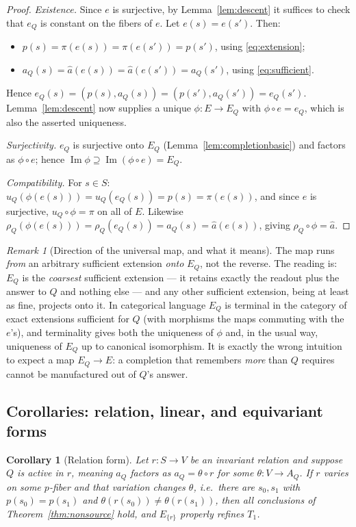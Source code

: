 \documentclass[11pt,reqno]{amsart}
\theoremstyle{plain}
\newtheorem{corollary}[theorem]{Corollary}
\theoremstyle{definition}
\theoremstyle{remark}
\newtheorem{remark}[theorem]{Remark}
\DeclareMathOperator{\Ima}{Im}
\begin{document}
\begin{proof}
\emph{Existence.} Since $e$ is surjective, by Lemma~\ref{lem:descent} it suffices to check that $e_Q$ is constant on the fibers of $e$. Let $e(s)=e(s')$. Then:
\begin{itemize}
\item $p(s)=\pi(e(s))=\pi(e(s'))=p(s')$, using \eqref{eq:extension};
\item $a_Q(s)=\hat a(e(s))=\hat a(e(s'))=a_Q(s')$, using \eqref{eq:sufficient}.
\end{itemize}
Hence $e_Q(s)=(p(s),a_Q(s))=(p(s'),a_Q(s'))=e_Q(s')$. Lemma~\ref{lem:descent} now supplies a unique $\phi\colon E\to E_Q$ with $\phi\circ e=e_Q$, which is also the asserted uniqueness.

\emph{Surjectivity.} $e_Q$ is surjective onto $E_Q$ (Lemma~\ref{lem:completionbasic}) and factors as $\phi\circ e$; hence $\Ima\phi\supseteq\Ima(\phi\circ e)=E_Q$.

\emph{Compatibility.} For $s\in S$: $u_Q(\phi(e(s)))=u_Q(e_Q(s))=p(s)=\pi(e(s))$, and since $e$ is surjective, $u_Q\circ\phi=\pi$ on all of $E$. Likewise $\rho_Q(\phi(e(s)))=\rho_Q(e_Q(s))=a_Q(s)=\hat a(e(s))$, giving $\rho_Q\circ\phi=\hat a$.
\end{proof}

\begin{remark}[Direction of the universal map, and what it means]\label{rem:direction}
The map runs \emph{from} an arbitrary sufficient extension \emph{onto} $E_Q$, not the reverse. The reading is: $E_Q$ is the \emph{coarsest} sufficient extension --- it retains exactly the readout plus the answer to $Q$ and nothing else --- and any other sufficient extension, being at least as fine, projects onto it. In categorical language $E_Q$ is terminal in the category of exact extensions sufficient for $Q$ (with morphisms the maps commuting with the $e$'s), and terminality gives both the uniqueness of $\phi$ and, in the usual way, uniqueness of $E_Q$ up to canonical isomorphism. It is exactly the wrong intuition to expect a map $E_Q\to E$: a completion that remembers \emph{more} than $Q$ requires cannot be manufactured out of $Q$'s answer.
\end{remark}

\subsection{Corollaries: relation, linear, and equivariant forms}

\begin{corollary}[Relation form]\label{cor:relationform}
Let $r\colon S\to V$ be an invariant relation and suppose $Q$ is \emph{active in $r$}, meaning $a_Q$ factors as $a_Q=\theta\circ r$ for some $\theta\colon V\to A_Q$. If $r$ varies on some $p$-fiber \emph{and that variation changes $\theta$}, i.e.\ there are $s_0,s_1$ with $p(s_0)=p(s_1)$ and $\theta(r(s_0))\neq\theta(r(s_1))$, then all conclusions of Theorem~\ref{thm:nonsource} hold, and $E_{\{r\}}$ properly refines $T_1$.
\end{corollary}
\end{document}

